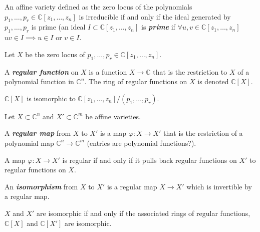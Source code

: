\begin{exercise}
	An affine variety defined as the zero locus of the polynomials $p_1,\ldots,p_r\in\mathbb{C}[z_1,\ldots,z_n]$ is irreducible if and only if the ideal generated by $p_1,\ldots,p_{r}$ is prime (an ideal $I\subset \mathbb{C}[z_1,\ldots,z_n]$ is \textit{\textbf{prime}} if $\forall u,v\in\mathbb{C}[z_1,\ldots,z_n]$ $uv\in I\implies u\in I$ or $v\in I$.
\end{exercise}

Let $X$ be the zero locus of $p_1,\ldots,p_r\in\mathbb{C}[z_1,\ldots,z_n]$.

\begin{defn}
	A \textit{\textbf{regular function}} on $X$ is a function $X \to  \mathbb{C}$ that is the restriction to $X$ of a polynomial function in $\mathbb{C}^{n}$. The ring of regular functions on $X$ is denoted $\mathbb{C}[X]$.
\end{defn}

\begin{exercise}
	$\mathbb{C}[X]$ is isomorphic to $\mathbb{C}[z_1,\ldots,z_n]/(p_1,\ldots,p_r)$.
\end{exercise}

Let $X\subset \mathbb{C}^{n}$ and $X'\subset \mathbb{C}^{m}$ be affine varieties.

\begin{defn}
	A \textit{\textbf{regular map}} from $X$ to $X'$ is a map $\varphi:X\to X'$ that is the restriction of a polynomial map $\mathbb{C}^n\longrightarrow \mathbb{C}^{m}$ (entries are polynomial functions?).
\end{defn}

\begin{exercise}
	A map $\varphi:X\longrightarrow X'$ is regular if and only if it pulls back regular functions on $X'$ to regular functions on $X$.
\end{exercise}

\begin{defn}
	An \textit{\textbf{isomorphism}} from $X$ to $X'$ is a regular map $X\to X'$ which is invertible by a regular map.
\end{defn}

\begin{exercise}\leavevmode
	$X$ and $X'$ are isomorphic if and only if the associated rings of regular functions,  $\mathbb{C}[X]$ and $\mathbb{C}[X']$ are isomorphic.
\end{exercise}

